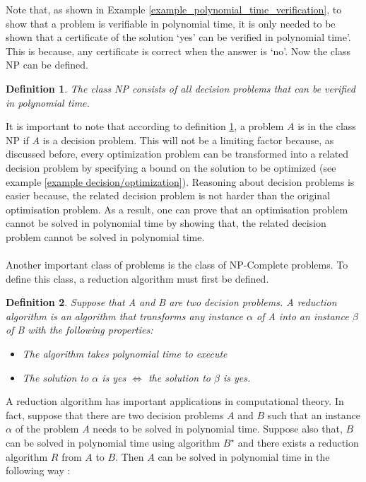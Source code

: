 \documentclass{article}
\newtheorem{definition}{Definition}[subsection]
\begin{document}
Note that, as shown in Example \ref{example_polynomial_time_verification}, to show that a problem is verifiable in polynomial time, it is only needed to be shown that a certificate of the solution `yes' can be verified in polynomial time'. This is because, any certificate is correct when the answer is `no'. Now the class NP can be defined.
\begin{definition}
\label{NP}
The class NP consists of all decision problems that can be verified in polynomial time. {}
\end{definition}
 It is important to note that according to definition \ref{NP}, a problem $\mathit{A}$ is in the class NP if $\mathit{A}$ is a decision problem. This will not be a limiting factor because, as discussed before, every optimization problem can be transformed into a related decision problem by specifying a bound on the solution to be optimized (see example \ref{example decision/optimization}). Reasoning about decision problems is easier because, the related decision problem is not harder than the original optimisation problem. As a result, one can prove that an optimisation problem cannot be solved in polynomial time by showing that, the related decision problem cannot be solved in polynomial time.\cite{cormen_leiserson_rivest_stein}\\\\
Another important class of problems is the class of NP-Complete problems. To define this class, a reduction algorithm must first be defined.
\begin{definition}
\label{reduction_algorithm}
Suppose that A and B are two decision problems. A reduction algorithm is an algorithm that transforms any instance $\alpha$ of A into an instance $\beta$ of B with the following properties:
\begin{itemize}
   \item The algorithm takes polynomial time to execute
   \item The solution to $\alpha$ is yes $\iff$ the solution to $\beta$ is yes. {}
\end{itemize} 
\end{definition}
A reduction algorithm has important applications in computational theory. In fact, suppose that there are two decision problems $\mathit{A}$ and $\mathit{B}$ such that an instance $\mathit{\alpha}$ of the problem $\mathit{A}$ needs to be solved in polynomial time. Suppose also that, $\mathit{B}$ can be solved in polynomial time using algorithm $\mathit{B^\star}$ and there exists a reduction algorithm $\mathit{R}$ from $\mathit{A}$ to $\mathit{B}$. Then $\mathit{A}$ can be solved in polynomial time in the following way :
\end{document}
